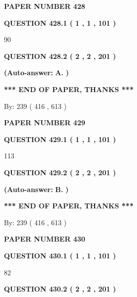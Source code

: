 \documentclass[12pt]{article}
\begin{document}
   
\newpage 
\setcounter{page}{ 
   428001 } 
   
   
 {\textbf{ \Large{ PAPER NUMBER  428  }}}
   
   
   
   
  
  
{\textbf{\large{QUESTION
428.1 
 ( 1 , 1 , 101 )
}}}

90
  
  
{\textbf{\large{QUESTION
428.2 
 ( 2 , 2 , 201 )
}}}
 
 
{\textbf{(Auto-answer:}}
{\textbf{\large{
A.}}}
{\textbf{)}}
 
 
   
   
   
   
\vspace{1.0in} 
{\textbf{\large{ *** END OF PAPER, THANKS *** }}} 
   
   
\hspace{1.0in} By: 
 239 ( 416 ,  613 )
   
   
   
   
\newpage 
\setcounter{page}{ 
   429001 } 
   
   
 {\textbf{ \Large{ PAPER NUMBER  429  }}}
   
   
   
   
  
  
{\textbf{\large{QUESTION
429.1 
 ( 1 , 1 , 101 )
}}}

113
  
  
{\textbf{\large{QUESTION
429.2 
 ( 2 , 2 , 201 )
}}}
 
 
{\textbf{(Auto-answer:}}
{\textbf{\large{
B.}}}
{\textbf{)}}
 
 
   
   
   
   
\vspace{1.0in} 
{\textbf{\large{ *** END OF PAPER, THANKS *** }}} 
   
   
\hspace{1.0in} By: 
 239 ( 416 ,  613 )
   
   
   
   
\newpage 
\setcounter{page}{ 
   430001 } 
   
   
 {\textbf{ \Large{ PAPER NUMBER  430  }}}
   
   
   
   
  
  
{\textbf{\large{QUESTION
430.1 
 ( 1 , 1 , 101 )
}}}

82
  
  
{\textbf{\large{QUESTION
430.2 
 ( 2 , 2 , 201 )
}}}
 
\end{document}
